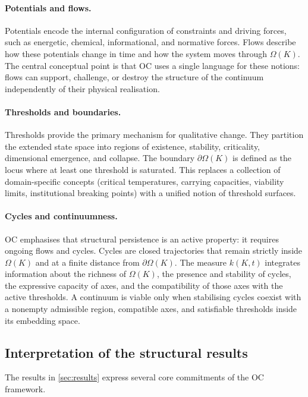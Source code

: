 \paragraph{Potentials and flows.}
Potentials encode the internal configuration of constraints and driving
forces, such as energetic, chemical, informational, and normative forces.
Flows describe how these potentials change in time and how the system moves through \(\Omega(K)\).
The central conceptual point is that OC uses a single language for these notions:
flows can support, challenge, or destroy the structure of the continuum independently of their physical realisation.

\paragraph{Thresholds and boundaries.}
Thresholds provide the primary mechanism for qualitative change.
They partition the extended state space into regions of existence, stability, criticality, dimensional emergence, and collapse.
The boundary \(\partial\Omega(K)\) is defined as the locus where at least one threshold is saturated.
This replaces a collection of domain-specific concepts (critical temperatures, carrying capacities, viability limits, institutional breaking points) with a unified notion of threshold surfaces.

\paragraph{Cycles and continuumness.}
OC emphasises that structural persistence is an active property: it requires ongoing flows and cycles.
Cycles are closed trajectories that remain strictly inside \(\Omega(K)\) and at a finite distance from \(\partial\Omega(K)\).
The measure \(k(K,t)\) integrates information about the richness of \(\Omega(K)\), the presence and stability of cycles, the expressive capacity of axes, and the compatibility of those axes with the active thresholds.
A continuum is viable only when stabilising cycles coexist with a nonempty
admissible region, compatible axes, and satisfiable thresholds inside its
embedding space.

\subsection{Interpretation of the structural results}

The results in \cref{sec:results} express several core commitments of the OC framework.

